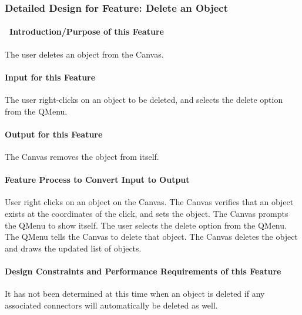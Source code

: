 \documentclass[twoside,letterpaper]{article}
\begin{document}
{\clearpage



% 
%

\subsubsection{Detailed Design for Feature: Delete an Object}

\paragraph[\ Introduction/Purpose of this Feature]
{\ Introduction/Purpose of this Feature}
{
The user deletes an object from the Canvas.
}

\paragraph[Input for this Feature]{Input for this Feature}
{
The user right-clicks on an object to be deleted, and selects the delete option from the QMenu.
}

\paragraph{Output for this Feature}
{
The Canvas removes the object from itself.
}

\paragraph{Feature Process to Convert Input to Output}
{
User right clicks on an object on the Canvas. The Canvas verifies that an object exists at the coordinates of the click, and sets the object.  The Canvas prompts the QMenu to show itself.  The user selects the delete option from the QMenu.  The QMenu tells the Canvas to delete that object. The Canvas deletes the object and draws the updated list of objects.
}

\paragraph{Design Constraints and Performance Requirements of this Feature}
{
It has not been determined at this time when an object is deleted if any associated connectors will automatically be deleted as well.
}
\bigskip
\bigskip

}
\end{document}

